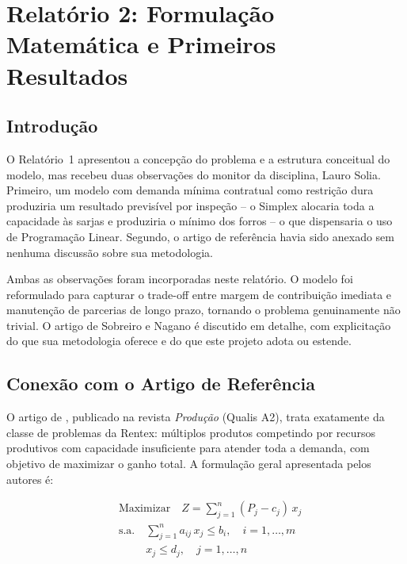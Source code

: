 
\section{Relatório 2: Formulação Matemática e Primeiros Resultados}

\subsection{Introdução}

O Relatório~1 apresentou a concepção do problema e a estrutura conceitual do
modelo, mas recebeu duas observações do monitor da disciplina, Lauro Solia.
Primeiro, um modelo com demanda mínima contratual como restrição dura produziria
um resultado previsível por inspeção -- o Simplex alocaria toda a capacidade às
sarjas e produziria o mínimo dos forros -- o que dispensaria o uso de
Programação Linear. Segundo, o artigo de referência havia sido anexado sem
nenhuma discussão sobre sua metodologia.

Ambas as observações foram incorporadas neste relatório. O modelo foi reformulado
para capturar o trade-off entre margem de contribuição imediata e manutenção de
parcerias de longo prazo, tornando o problema genuinamente não trivial. O artigo
de Sobreiro e Nagano é discutido em detalhe, com explicitação do que sua
metodologia oferece e do que este projeto adota ou estende.

\newpage

\subsection{Conexão com o Artigo de Referência}

O artigo de \textcite{sobreiro2013}, publicado na revista \textit{Produção}
(Qualis A2), trata exatamente da classe de problemas da Rentex: múltiplos
produtos competindo por recursos produtivos com capacidade insuficiente para
atender toda a demanda, com objetivo de maximizar o ganho total. A formulação
geral apresentada pelos autores é:

\begin{align}
  &\text{Maximizar} \quad Z = \sum_{j=1}^{n} (P_j - c_j)\, x_j \nonumber \\
  &\text{s.a.} \quad \sum_{j=1}^{n} a_{ij}\, x_j \leq b_i, \quad i = 1, \ldots, m \nonumber \\
  &\phantom{\text{s.a.}} \quad x_j \leq d_j, \quad j = 1, \ldots, n \nonumber
\end{align}

